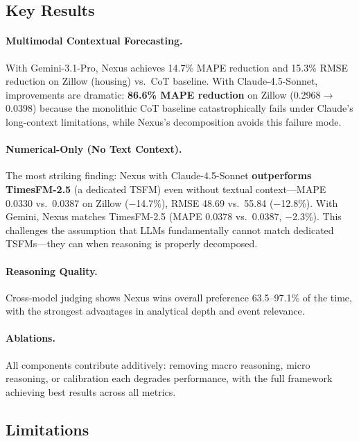 \documentclass[11pt,a4paper]{article}
\begin{document}
\subsection{Key Results}

\paragraph{Multimodal Contextual Forecasting.} With Gemini-3.1-Pro, Nexus achieves 14.7\% MAPE reduction and 15.3\% RMSE reduction on Zillow (housing) vs.\ CoT baseline. With Claude-4.5-Sonnet, improvements are dramatic: \textbf{86.6\% MAPE reduction} on Zillow (0.2968$\rightarrow$0.0398) because the monolithic CoT baseline catastrophically fails under Claude's long-context limitations, while Nexus's decomposition avoids this failure mode.

\paragraph{Numerical-Only (No Text Context).} The most striking finding: Nexus with Claude-4.5-Sonnet \textbf{outperforms TimesFM-2.5} (a dedicated TSFM) even without textual context---MAPE 0.0330 vs.\ 0.0387 on Zillow ($-$14.7\%), RMSE 48.69 vs.\ 55.84 ($-$12.8\%). With Gemini, Nexus matches TimesFM-2.5 (MAPE 0.0378 vs.\ 0.0387, $-$2.3\%). This challenges the assumption that LLMs fundamentally cannot match dedicated TSFMs---they can when reasoning is properly decomposed.

\paragraph{Reasoning Quality.} Cross-model judging shows Nexus wins overall preference 63.5--97.1\% of the time, with the strongest advantages in analytical depth and event relevance.

\paragraph{Ablations.} All components contribute additively: removing macro reasoning, micro reasoning, or calibration each degrades performance, with the full framework achieving best results across all metrics.

\subsection{Limitations}
\end{document}
